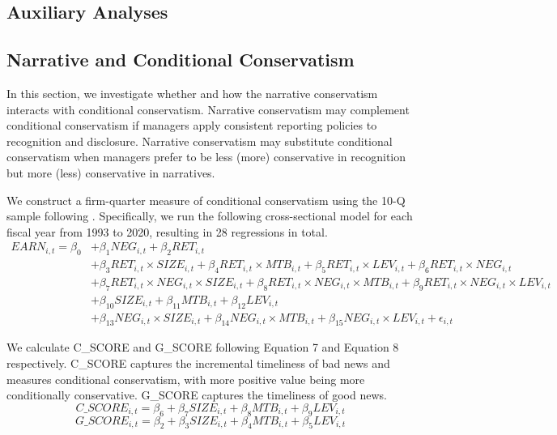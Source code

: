 \documentclass[a4paper]{article}
\begin{document}
\begin{spacing}{2}
\section{Auxiliary Analyses}
\subsection{Narrative and Conditional Conservatism}
In this section, we investigate whether and how the narrative conservatism interacts with conditional conservatism. Narrative conservatism may complement conditional conservatism if managers apply consistent reporting policies to recognition and disclosure. Narrative conservatism may substitute conditional conservatism when managers prefer to be less (more) conservative in recognition but more (less) conservative in narratives.

We construct a firm-quarter measure of conditional conservatism using the 10-Q sample following . Specifically, we run the following cross-sectional model for each fiscal year from 1993 to 2020, resulting in 28 regressions in total.
\begin{equation} \label{eq6}
\begin{split}
EARN_{i,t} = \beta_0&+\beta_1NEG_{i,t}+\beta_2RET_{i,t}\\
&+\beta_3RET_{i,t}\times SIZE_{i,t}+\beta_4RET_{i,t}\times MTB_{i,t}+\beta_5RET_{i,t}\times LEV_{i,t}+\beta_6RET_{i,t}\times NEG_{i,t}\\
&+\beta_7RET_{i,t}\times NEG_{i,t}\times SIZE_{i,t}+\beta_8RET_{i,t}\times NEG_{i,t}\times MTB_{i,t}+\beta_9RET_{i,t}\times NEG_{i,t}\times LEV_{i,t}\\
&+\beta_{10}SIZE_{i,t}+\beta_{11}MTB_{i,t}+\beta_{12}LEV_{i,t}\\
&+\beta_{13}NEG_{i,t}\times SIZE_{i,t}+\beta_{14}NEG_{i,t}\times MTB_{i,t}+\beta_{15}NEG_{i,t}\times LEV_{i,t}+ \epsilon_{i,t}
\end{split}
\end{equation}

We calculate C\_SCORE and G\_SCORE following Equation 7 and Equation 8 respectively. C\_SCORE captures the incremental timeliness of bad news and measures conditional conservatism, with more positive value being more conditionally conservative. G\_SCORE captures the timeliness of good news.
\begin{equation}\label{eq7}
C\_SCORE_{i,t} = \beta_6+\beta_7SIZE_{i,t}+\beta_8MTB_{i,t}+\beta_9LEV_{i,t}
\end{equation}
\begin{equation}\label{eq8}
G\_SCORE_{i,t} = \beta_2+\beta_3SIZE_{i,t}+\beta_4MTB_{i,t}+\beta_5LEV_{i,t}
\end{equation}


\end{spacing}
\end{document}
